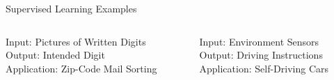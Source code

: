 \documentclass[8pt,aspectratio=169]{beamer}
\begin{document}
\begin{frame}{Supervised Learning Examples}
\begin{columns}[T]
\begin{column}{.33\textwidth}
\begin{center}
  Input: Pictures of Written Digits\\
  Output: Intended Digit\\
  Application: Zip-Code Mail Sorting
\end{center}
\end{column}

\pause
\begin{column}{.33\textwidth}
\begin{center}
  \vspace{2mm}

  Input: Environment Sensors\\
  Output: Driving Instructions\\
  Application: Self-Driving Cars
\end{center}
\end{column}
\end{columns}

\end{frame}




\end{document}
